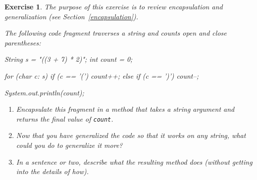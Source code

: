 \documentclass[12pt]{book}
\theoremstyle{exercise}
\newtheorem{exercise}{Exercise}[chapter]
\newcommand{\java}[1]{\verb"#1"}
\newcommand{\java}[1]{\lstinline{#1}} %
\begin{document}
\begin{exercise}

The purpose of this exercise is to review encapsulation and generalization (see Section~\ref{encapsulation}).

The following code fragment traverses a string and counts open and close parentheses:

\begin{code}
    String s = "((3 + 7) * 2)";
    int count = 0;

    for (char c: s) {
        if (c == '(') {
            count++;
        } else if (c == ')') {
            count--;
        }
    }

    System.out.println(count);
\end{code}

\begin{enumerate}

\item Encapsulate this fragment in a method that takes a string argument and returns the final value of \java{count}.

\item Now that you have generalized the code so that it works on any string, what could you do to generalize it more?

\item In a sentence or two, describe what the resulting method does (without getting into the details of how).

\end{enumerate}

\end{exercise}
\end{document}

